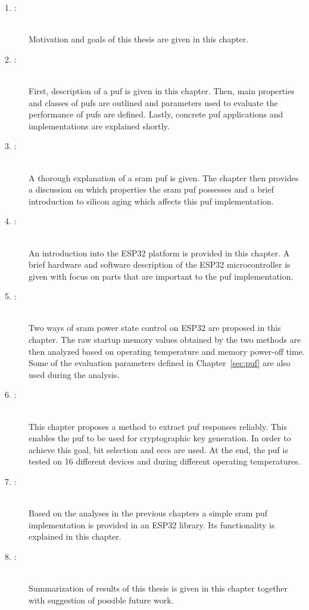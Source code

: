 \begin{description}
    \item[1. :] \hfill \\
        Motivation and goals of this thesis are given in this chapter.
    \item[2. :] \hfill \\
        First, description of a \gls{puf} is given in this chapter. Then, main properties and classes of \glspl{puf} are outlined and parameters used to evaluate the performance of \glspl{puf} are defined. Lastly, concrete \gls{puf} applications and implementations are explained shortly.
    \item[3. :] \hfill \\
        A thorough explanation of a \gls{sram} \gls{puf} is given. The chapter then provides a discussion on which properties the \gls{sram} \gls{puf} possesses and a brief introduction to silicon aging which affects this \gls{puf} implementation. 
    \item[4. :] \hfill \\
        An introduction into the ESP32 platform is provided in this chapter. A brief hardware and software description of the ESP32 microcontroller is given with focus on parts that are important to the \gls{puf} implementation.
    \item[5. :] \hfill \\
        Two ways of \gls{sram} power state control on ESP32 are proposed in this chapter. The raw startup memory values obtained by the two methods are then analyzed based on operating temperature and memory power-off time. Some of the evaluation parameters defined in Chapter~\ref{sec:puf} are also used during the analysis.
    \item[6. :] \hfill \\
        This chapter proposes a method to extract \gls{puf} responses reliably. This enables the \gls{puf} to be used for cryptographic key generation. In order to achieve this goal, bit selection and \glspl{ecc} are used. At the end, the \gls{puf} is tested on 16 different devices and during different operating temperatures.
    \item[7. :] \hfill \\
        Based on the analyses in the previous chapters a simple \gls{sram} \gls{puf} implementation is provided in an ESP32 library. Its functionality is explained in this chapter.
    \item[8. :] \hfill \\
        Summarization of results of this thesis is given in this chapter together with suggestion of possible future work.
\end{description}


